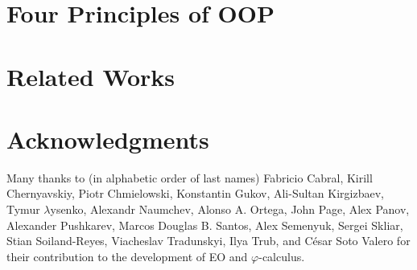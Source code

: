 \documentclass[sigplan,nonacm=true]{acmart}
\theoremstyle{theorems}
\newcommand\nospell[1]{#1}
\newcommand\phic{{$\varphi$-calculus}}
\newcommand\eo{{\sffamily EO}}
\begin{document}
\section{Four Principles of OOP}
\label{sec:four}


\section{Related Works}
\label{sec:related}


\section{Acknowledgments}

Many thanks to (in alphabetic order of last names)
  \nospell{Fabricio Cabral},
  \nospell{Kirill Chernyavskiy},
  \nospell{Piotr Chmielowski},
  \nospell{Konstantin Gukov},
  \nospell{Ali-Sultan Kirgizbaev},
  \nospell{Tymur $\lambda$ysenko},
  \nospell{Alexandr Naumchev},
  \nospell{Alonso A. Ortega},
  \nospell{John Page},
  \nospell{Alex Panov},
  \nospell{Alexander Pushkarev},
  \nospell{Marcos Douglas B. Santos},
  \nospell{Alex Semenyuk},
  \nospell{Sergei Skliar},
  \nospell{Stian Soiland-Reyes},
  \nospell{Viacheslav Tradunskyi},
  \nospell{Ilya Trub},
  and
  \nospell{César Soto Valero}
for their contribution to the development of \eo{} and \phic{}.


\raggedright

\clearpage
\end{document}

